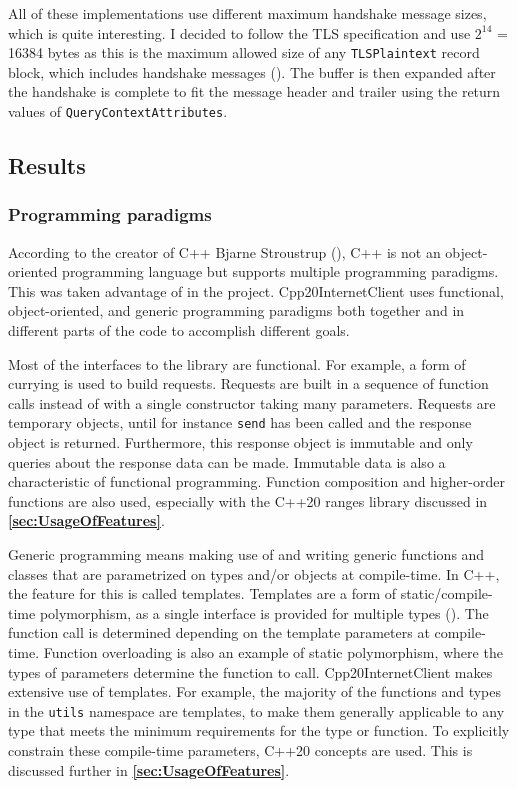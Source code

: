 \documentclass[12pt, a4paper]{article}
\begin{document}
All of these implementations use different maximum handshake message sizes, which is quite interesting. I decided to follow the TLS specification and use $2^{14}$ = 16384 bytes as this is the maximum allowed size of any \texttt{TLSPlaintext} record block, which includes handshake messages (\cite{TlsSpec}). The buffer is then expanded after the handshake is complete to fit the message header and trailer using the return values of \texttt{QueryContextAttributes}.
\subsection{Results}\label{sec:Results}
\subsubsection{Programming paradigms}
According to the creator of C++ Bjarne Stroustrup (\citeyear{CppNotJustObjectOriented}), C++ is not an object-oriented programming language but supports multiple programming paradigms. This was taken advantage of in the project. Cpp20InternetClient uses functional, object-oriented, and generic programming paradigms both together and in different parts of the code to accomplish different goals. 

Most of the interfaces to the library are functional. For example, a form of currying is used to build requests. Requests are built in a sequence of function calls instead of with a single constructor taking many parameters. Requests are temporary objects, until for instance \texttt{send} has been called and the response object is returned. Furthermore, this response object is immutable and only queries about the response data can be made. Immutable data is also a characteristic of functional programming. Function composition and higher-order functions are also used, especially with the C++20 ranges library discussed in \textbf{\ref{sec:UsageOfFeatures}}.

Generic programming means making use of and writing generic functions and classes that are parametrized on types and/or objects at compile-time. In C++, the feature for this is called templates. Templates are a form of static/compile-time polymorphism, as a single interface is provided for multiple types (\cite{StaticPolymorphism}). The function call is determined depending on the template parameters at compile-time. Function overloading is also an example of static polymorphism, where the types of parameters determine the function to call. Cpp20InternetClient makes extensive use of templates. For example, the majority of the functions and types in the \texttt{utils} namespace are templates, to make them generally applicable to any type that meets the minimum requirements for the type or function. To explicitly constrain these compile-time parameters, C++20 concepts are used. This is discussed further in \textbf{\ref{sec:UsageOfFeatures}}.
\end{document}
